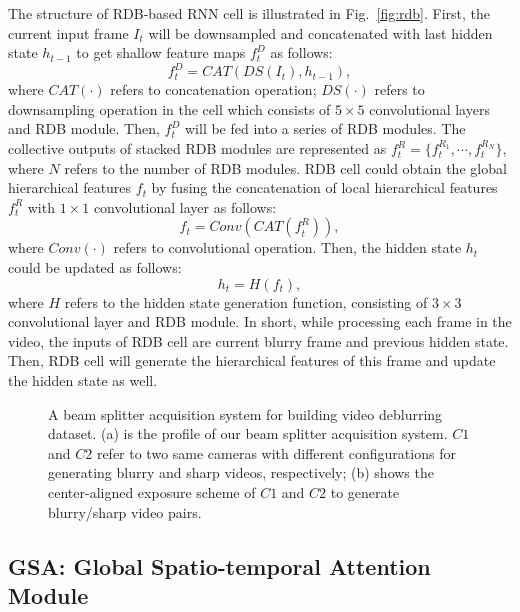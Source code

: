 \documentclass[twocolumn]{svjour3}          \smartqed  \usepackage{graphicx}
\begin{document}
The structure of RDB-based RNN cell is illustrated in Fig.~\ref{fig:rdb}. First, the current input frame $I_t$ will be downsampled and concatenated with last hidden state $h_{t-1}$ to get shallow feature maps $f^{D}_t$ as follows:
\begin{equation}
f^{D}_t = \mathit{CAT}(\mathit{DS}(I_t), h_{t-1}),
\end{equation}
where $\mathit{CAT(\cdot)}$ refers to concatenation operation; $\mathit{DS(\cdot)}$ refers to downsampling operation in the cell which consists of $5\times5$ convolutional layers and RDB module. Then, $f^{D}_t$ will be fed into a series of RDB modules. The collective outputs of stacked RDB modules are represented as $f^R_t=\{f^{R_1}_t, \cdots, f^{R_N}_t\}$, where $N$ refers to the number of RDB modules. RDB cell could obtain the global hierarchical features $f_t$ by fusing the concatenation of local hierarchical features $f^R_t$ with $1\times1$ convolutional layer as follows:
\begin{equation}
f_t=\mathit{Conv}(\mathit{CAT(f^R_t)}),
\end{equation}
where $\mathit{Conv(\cdot)}$ refers to convolutional operation. Then, the hidden state $h_t$ could be updated as follows:
\begin{equation}
h_t = H(f_t),
\end{equation}
where $H$ refers to the hidden state generation function, consisting of $3\times3$ convolutional layer and RDB module. In short, while processing each frame in the video, the inputs of RDB cell are current blurry frame and previous hidden state. Then, RDB cell will generate the hierarchical features of this frame and update the hidden state as well.

\begin{figure*}[!ht]
	\centering
{}
	\hfil
	\caption{A beam splitter acquisition system for building video deblurring dataset. (a) is the profile of our beam splitter acquisition system. $C1$ and $C2$ refer to two same cameras with different configurations for generating blurry and sharp videos, respectively; (b) shows the center-aligned exposure scheme of $C1$ and $C2$ to generate blurry/sharp video pairs.}
	\label{fig:system}
\end{figure*}

\subsection{GSA: Global Spatio-temporal Attention Module}
\label{sec:GSA}
\end{document}
